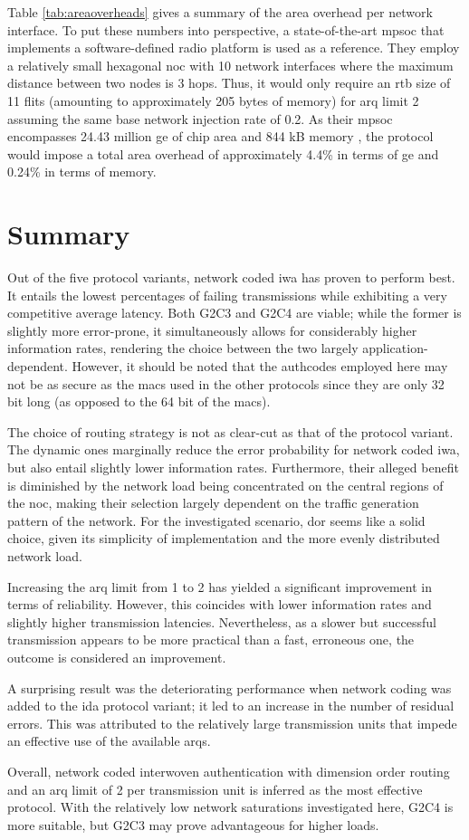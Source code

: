 Table \vref{tab:areaoverheads} gives a summary of the area overhead per network interface. To put these numbers into perspective, a state-of-the-art
\gls{mpsoc} that implements a software-defined radio platform \cite{haas18sdrmpsoc} is used as a reference. They employ a relatively small hexagonal
\gls{noc} with 10 network interfaces where the maximum distance between two nodes is 3 hops. Thus, it would only require an \gls{rtb} size of 11 flits
(amounting to approximately 205 bytes of memory) for \gls{arq} limit 2 assuming the same base network injection rate of 0.2. As their \gls{mpsoc} encompasses 24.43
million \gls{ge} of chip area and 844 kB memory \cite[4]{haas18sdrmpsoc}, the protocol would impose a total area overhead of approximately 4.4\% in
terms of \gls{ge} and 0.24\% in terms of memory.

\section{Summary}\label{sec:summaryeval}
Out of the five protocol variants, network coded \gls{iwa} has proven to perform best. It entails the lowest percentages of failing
transmissions while exhibiting a very competitive average latency. Both G2C3 and G2C4 are viable; while the former is slightly more error-prone, it
simultaneously allows for considerably higher information rates, rendering the choice between the two largely application-dependent. However, it
should be noted that the authcodes employed here may not be as secure as the \glspl{mac} used in the other protocols since they are only 32 bit long
(as opposed to the 64 bit of the \glspl{mac}).

The choice of routing strategy is not as clear-cut as that of the protocol variant. The dynamic ones marginally reduce the error probability for
network coded \gls{iwa}, but also entail slightly lower information rates. Furthermore, their alleged benefit is diminished by the network load being
concentrated on the central regions of the \gls{noc}, making their selection largely dependent on the traffic generation pattern of the network. For the
investigated scenario, \gls{dor} seems like a solid choice, given its simplicity of implementation and the more evenly distributed network load.

Increasing the \gls{arq} limit from 1 to 2 has yielded a significant improvement in terms of reliability. However, this coincides with lower
information rates and slightly higher transmission latencies. Nevertheless, as a slower but successful transmission appears to be more practical than
a fast, erroneous one, the outcome is considered an improvement.

A surprising result was the deteriorating performance when network coding was added to the \gls{ida} protocol variant; it led to an increase in the
number of residual errors. This was attributed to the relatively large transmission units that impede an effective use of the available \glspl{arq}.

Overall, network coded interwoven authentication with dimension order routing and an \gls{arq} limit of 2 per transmission unit is inferred as the
most effective protocol. With the relatively low network saturations investigated here, G2C4 is more suitable, but G2C3 may prove advantageous for
higher loads.
